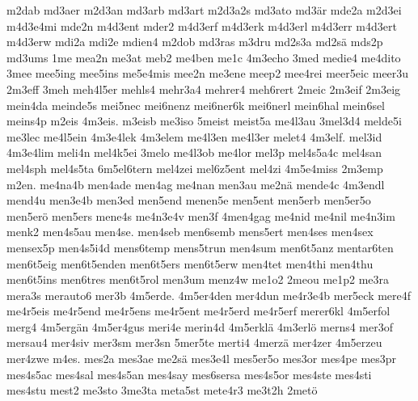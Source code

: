{    m2dab
    md3aer
    m2d3an
    md3arb
    md3art
    m2d3a2s
    md3ato
    md3är
    mde2a
    m2d3ei
    m4d3e4mi
    mde2n
    m4d3ent
    mder2
    m4d3erf
    m4d3erk
    m4d3erl
    m4d3err
    m4d3ert
    m4d3erw
    mdi2a
    mdi2e
    mdien4
    m2dob
    md3ras
    m3dru
    md2s3a
    md2sä
    mds2p
    md3ums
    1me
    mea2n
    me3at
    meb2
    me4ben
    me1c
    4m3echo
    3med
    medie4
    me4dito
    3mee
    mee5ing
    mee5ins
    me5e4mis
    mee2n
    me3ene
    meep2
    mee4rei
    meer5eic
    meer3u
    2m3eff
    3meh
    meh4l5er
    mehls4
    mehr3a4
    mehrer4
    meh6rert
    2meic
    2m3eif
    2m3eig
    mein4da
    meinde5s
    mei5nec
    mei6nenz
    mei6ner6k
    mei6nerl
    mein6hal
    mein6sel
    meins4p
    m2eis
    4m3eis.
    m3eisb
    me3iso
    5meist
    meist5a
    me4l3au
    3mel3d4
    melde5i
    me3lec
    me4l5ein
    4m3e4lek
    4m3elem
    me4l3en
    me4l3er
    melet4
    4m3elf.
    mel3id
    4m3e4lim
    meli4n
    mel4k5ei
    3melo
    me4l3ob
    me4lor
    mel3p
    mel4s5a4c
    mel4san
    mel4sph
    mel4s5ta
    6m5el6tern
    mel4zei
    mel6z5ent
    mel4zi
    4m5e4miss
    2m3emp
    m2en.
    me4na4b
    men4ade
    men4ag
    me4nan
    men3au
    me2nä
    mende4c
    4m3endl
    mend4u
    men3e4b
    men3ed
    men5end
    menen5e
    men5ent
    men5erb
    men5er5o
    men5erö
    men5ers
    mene4s
    me4n3e4v
    men3f
    4men4gag
    me4nid
    me4nil
    me4n3im
    menk2
    men4s5au
    men4se.
    men4seb
    men6semb
    mens5ert
    men4ses
    men4sex
    mensex5p
    men4s5i4d
    mens6temp
    mens5trun
    men4sum
    men6t5anz
    mentar6ten
    men6t5eig
    men6t5enden
    men6t5ers
    men6t5erw
    men4tet
    men4thi
    men4thu
    men6t5ins
    men6tres
    men6t5rol
    men3um
    menz4w
    me1o2
    2meou
    me1p2
    me3ra
    mera3s
    merauto6
    mer3b
    4m5erde.
    4m5er4den
    mer4dun
    me4r3e4b
    mer5eck
    mere4f
    me4r5eis
    me4r5end
    me4r5ens
    me4r5ent
    me4r5erd
    me4r5erf
    merer6kl
    4m5erfol
    merg4
    4m5ergän
    4m5er4gus
    meri4e
    merin4d
    4m5erklä
    4m3erlö
    merns4
    mer3of
    mersau4
    mer4siv
    mer3sm
    mer3sn
    5mer5te
    merti4
    4merzä
    mer4zer
    4m5erzeu
    mer4zwe
    m4es.
    mes2a
    mes3ae
    me2sä
    mes3e4l
    mes5er5o
    mes3or
    mes4pe
    mes3pr
    mes4s5ac
    mes4sal
    mes4s5an
    mes4say
    mes6sersa
    mes4s5or
    mes4ste
    mes4sti
    mes4stu
    mest2
    me3sto
    3me3ta
    meta5st
    mete4r3
    me3t2h
    2metö
}
